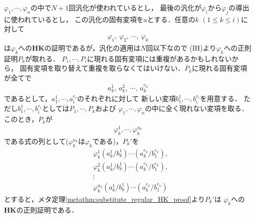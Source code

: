 \begin{metaprf}
\begin{description}
				$\varphi_{1},\cdots,\varphi_{n}$の中で$N+1$回汎化が使われているとし，
				最後の汎化が$\varphi_{i}$から$\varphi_{j}$の導出に使われているとし，
				この汎化の固有変項を$a$とする．任意の$k$ $(1 \leq k \leq i)$に対して
				\begin{align}
					\varphi_{1},\ \varphi_{2},\ \cdots,\ \varphi_{k}
				\end{align}
				は$\varphi_{k}$への{\bf HK}の証明であるが，汎化の適用は$N$回以下なので
				(IH)より$\varphi_{k}$への正則証明$P_{k}$が取れる．
				$P_{1},\cdots,P_{i}$に現れる固有変項には重複があるかもしれないから，
				固有変項を取り替えて重複を取らなくてはいけない．$P_{k}$に現れる固有変項が全てで
				\begin{align}
					a_{k}^{1},\ a_{k}^{2},\ \cdots,\ a_{k}^{e_{k}}
				\end{align}
				であるとして，$a_{1}^{1},\cdots,a_{i}^{e_{i}}$のそれぞれに対して
				新しい変項$b_{1}^{1},\cdots,b_{i}^{e_{i}}$を用意する．
				ただし$b_{1}^{1},\cdots,b_{i}^{e_{i}}$としては$P_{1},\cdots,P_{k}$および
				$\varphi_{1},\cdots,\varphi_{n}$の中に全く現れない変項を取る．
				このとき，$P_{k}$が
				\begin{align}
					\varphi_{k}^{1},\cdots,\varphi_{k}^{u_{k}}
				\end{align}
				である式の列として($\varphi_{k}^{u_{k}}$は$\varphi_{k}$である)，$P_{k}'$を
				\begin{align}
					&\varphi_{k}^{1}(a_{k}^{1}/b_{k}^{1})\cdots(a_{k}^{e_{k}}/b_{1}^{e_{k}}), \\
					&\varphi_{k}^{2}(a_{k}^{1}/b_{k}^{1})\cdots(a_{k}^{e_{k}}/b_{1}^{e_{k}}), \\
					&\vdots \\ 
					&\varphi_{k}^{u_{k}}(a_{k}^{1}/b_{k}^{1})\cdots(a_{k}^{e_{k}}/b_{1}^{e_{k}})
				\end{align}
				とすると，メタ定理\ref{metathm:substitute_regular_HK_proof}より$P_{k}'$は
				$\varphi_{k}$への{\bf HK}の正則証明である．
				

\end{description}
\end{metaprf}
